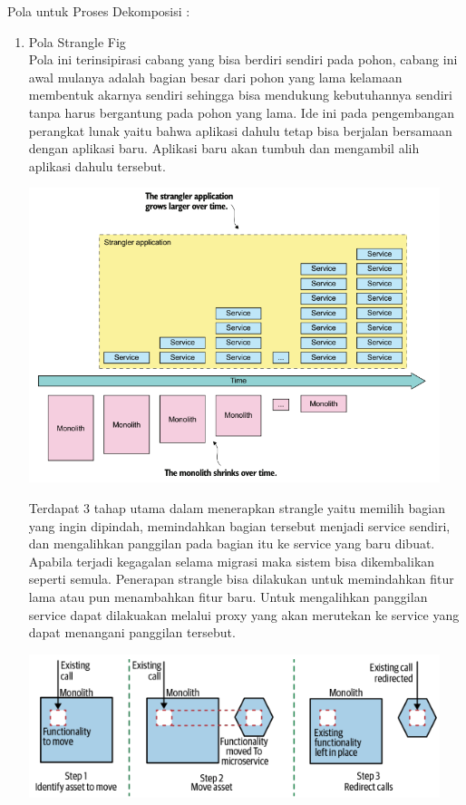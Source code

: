 Pola untuk Proses Dekomposisi \cite{74C}:
\begin{enumerate}[leftmargin=1.3cm]
	\item Pola Strangle Fig \\
		  Pola ini terinsipirasi cabang yang bisa berdiri sendiri pada pohon, cabang ini awal mulanya adalah bagian besar dari pohon yang lama kelamaan membentuk akarnya sendiri sehingga bisa mendukung kebutuhannya sendiri tanpa harus bergantung pada pohon yang lama.  Ide ini pada pengembangan perangkat lunak yaitu bahwa aplikasi dahulu tetap bisa berjalan bersamaan dengan aplikasi baru. Aplikasi baru akan tumbuh dan mengambil alih aplikasi dahulu tersebut.

		  \begin{center}
			\includegraphics[width=12cm]{img/bab_2/strangle_timeline.png}
			\label{fig:asd}
		  \end{center}

		  Terdapat 3 tahap utama dalam menerapkan strangle yaitu memilih bagian yang ingin dipindah, memindahkan bagian tersebut menjadi service sendiri, dan mengalihkan panggilan pada bagian itu ke service yang baru dibuat. Apabila terjadi kegagalan selama migrasi maka sistem bisa dikembalikan seperti semula. Penerapan strangle bisa dilakukan untuk memindahkan fitur lama atau pun menambahkan fitur baru.	Untuk mengalihkan panggilan service dapat dilakuakan melalui proxy yang akan merutekan ke service yang dapat menangani panggilan tersebut.

		 \begin{center}
			\includegraphics[width=12cm]{img/bab_2/strangle_process.png}
			\label{fig:asd}
		 \end{center}


\end{enumerate}

